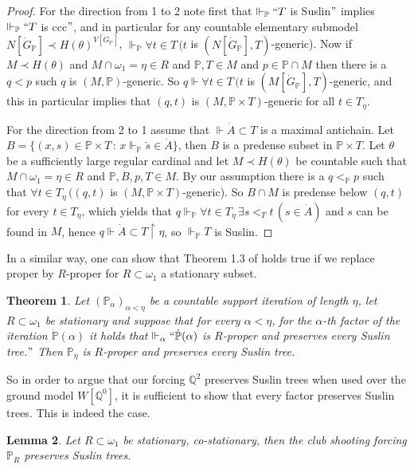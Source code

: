 \documentclass[a4paper,11pt]{article}
\newtheorem{theorem}{Theorem}[section]
\newtheorem{lemma}[theorem]{Lemma}
\newcommand{\forceP}{\mathbb{P}}
\newcommand{\forceQ}{\mathbb{Q}}
\begin{document}
\begin{proof}
For the direction from 1 to 2 note first that $\Vdash_{\forceP} ``T$ is Suslin$"$ implies $\Vdash_{\forceP} ``T$ is ccc$"$, and in particular for any countable elementary submodel $N[\dot{G}_{\forceP}] \prec H(\theta)^{V[\dot{G}_{\forceP}]}$,  $\Vdash_{\forceP} \forall t \in T \, (t$ is $(N[\dot{G}_{\forceP}],T)$-generic). Now if $M \prec H(\theta)$ and $M \cap \omega_1 = \eta \in R$ and $\forceP,T \in M$ and $p \in \forceP \cap M$ then there is a $q<p$ such $q$ is $(M,\forceP)$-generic. So $q \Vdash \forall t \in T \, (t$ is $(M[\dot{G}_{\forceP}], T)$-generic, and this in particular implies that $(q,t)$ is $(M, \forceP \times T)$-generic for all $t \in T_{\eta}$. 

For the direction from 2 to 1 assume that $\Vdash \dot{A} \subset T$ is a maximal antichain. Let $B=\{(x,s) \in \forceP \times T \, : \, x \Vdash_{\forceP} \check{s} \in \dot{A} \}$, then $B$ is a predense subset in $\forceP \times T$. Let $\theta$ be a sufficiently large regular cardinal and let $M \prec H(\theta)$ be countable such that $M \cap \omega_1=\eta \in R$ and $\forceP, B,p,T \in M$. By our assumption there is a $q <_{\forceP} p$  such that $\forall t \in T_{\eta} \, ((q,t)$ is $(M, \forceP \times T)$-generic). So $B \cap M$ is predense below $(q,t)$ for every $t \in T_{\eta}$, which yields that $q \Vdash_{\forceP} \forall t \in T_{\eta}\,  \exists s<_{T} t \, (s \in \dot{A})$ and $s$ can be found in $M$, hence $q \Vdash \dot{A} \subset T \upharpoonright \eta$, so $\Vdash_{\forceP} T$ is Suslin.
\end{proof}
In a similar way, one can show that Theorem 1.3 of \cite{Miyamoto2} holds true if we replace proper by $R$-proper for $R \subset \omega_1$ a stationary subset.
\begin{theorem}
Let $(\forceP_{\alpha})_{\alpha < \eta}$ be a countable support iteration of length $\eta$, let $R \subset \omega_1$ be stationary and suppose that for every $\alpha < \eta$, for the $\alpha$-th factor of the iteration $\dot{\forceP}(\alpha)$ it holds that $\Vdash_{\alpha}  ``\dot{\forceP}(\alpha)$ is $R$-proper and 
preserves every Suslin tree.$"$ Then $\forceP_{\eta}$ is $R$-proper and preserves every Suslin tree.
\end{theorem}
So in order to argue that our forcing $\forceQ^2$ preserves Suslin trees when used over the ground model $W[\forceQ^0]$, it is sufficient to show that every factor preserves Suslin trees.
This is indeed the case.
\begin{lemma}
Let $R \subset \omega_1$ be stationary, co-stationary, then the club shooting forcing $\forceP_R$ preserves Suslin trees.
\end{lemma}
\end{document}
